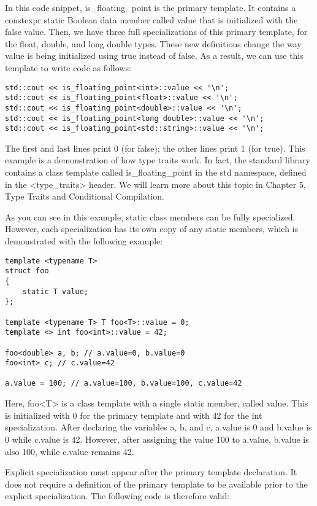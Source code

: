 In this code snippet, is\_floating\_point is the primary template. It contains a constexpr static Boolean data member called value that is initialized with the false value. Then, we have three full specializations of this primary template, for the float, double, and long double types. These new definitions change the way value is being initialized using true instead of false. As a result, we can use this template to write code as follows:

\begin{lstlisting}[style=styleCXX]
std::cout << is_floating_point<int>::value << '\n';
std::cout << is_floating_point<float>::value << '\n';
std::cout << is_floating_point<double>::value << '\n';
std::cout << is_floating_point<long double>::value << '\n';
std::cout << is_floating_point<std::string>::value << '\n';
\end{lstlisting}

The first and last lines print 0 (for false); the other lines print 1 (for true). This example is a demonstration of how type traits work. In fact, the standard library contains a class template called is\_floating\_point in the std namespace, defined in the <type\_traits> header. We will learn more about this topic in Chapter 5, Type Traits and Conditional Compilation.

As you can see in this example, static class members can be fully specialized. However, each specialization has its own copy of any static members, which is demonstrated with the following example:

\begin{lstlisting}[style=styleCXX]
template <typename T>
struct foo
{
	static T value;
};

template <typename T> T foo<T>::value = 0;
template <> int foo<int>::value = 42;

foo<double> a, b; // a.value=0, b.value=0
foo<int> c; // c.value=42

a.value = 100; // a.value=100, b.value=100, c.value=42
\end{lstlisting}

Here, foo<T> is a class template with a single static member, called value. This is initialized with 0 for the primary template and with 42 for the int specialization. After declaring the variables a, b, and c, a.value is 0 and b.value is 0 while c.value is 42. However, after assigning the value 100 to a.value, b.value is also 100, while c.value remains 42.

Explicit specialization must appear after the primary template declaration. It does not require a definition of the primary template to be available prior to the explicit specialization. The following code is therefore valid:

